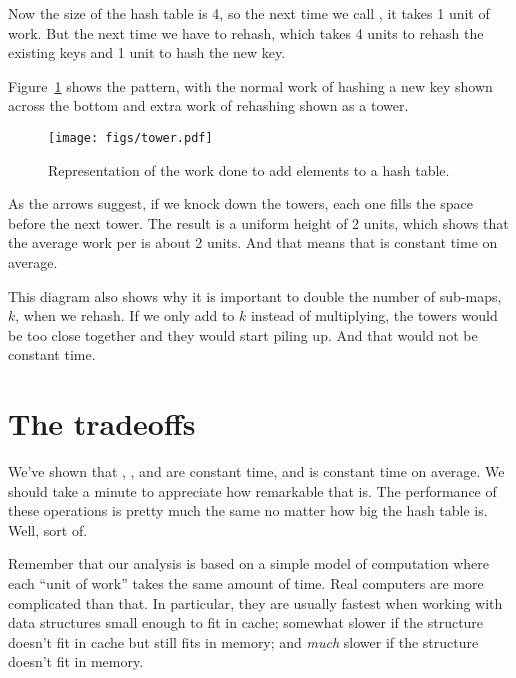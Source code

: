\documentclass[12pt]{book}
\theoremstyle{exercise}
\begin{document}
Now the size of the hash table is 4, so the next time we call
, it takes 1 unit of work. But the next time we have to
rehash, which takes 4 units to rehash the existing keys and 1 unit to
hash the new key.


Figure~\ref{fig-hashtable} shows the pattern, with the normal work of hashing
a new key shown across the bottom and extra work of rehashing shown as a
tower.

\begin{figure}
\centerline{\texttt{[image: figs/tower.pdf]}}
\caption{Representation of the work done to add elements to a hash table.}
\label{fig-hashtable}
\end{figure}

As the arrows suggest, if we knock down the towers, each one fills the
space before the next tower. The result is a uniform height of 2 units,
which shows that the average work per  is about 2 units. And
that means that  is constant time on average.

This diagram also shows why it is important to double the number of
sub-maps, $k$, when we rehash. If we only add to $k$
instead of multiplying, the towers would be too close together and
they would start piling up. And that would not be constant
time.



\section{The tradeoffs}
\label{the-tradeoffs}

We've shown that , , and 
are constant time, and  is constant time on average. We
should take a minute to appreciate how remarkable that is. The
performance of these operations is pretty much the same no matter how
big the hash table is. Well, sort of.


Remember that our analysis is based on a simple model of computation
where each ``unit of work'' takes the same amount of time. Real
computers are more complicated than that. In particular, they are
usually fastest when working with data structures small enough to fit in
cache; somewhat slower if the structure doesn't fit in cache but still
fits in memory; and \emph{much} slower if the structure doesn't fit in
memory.
\end{document}
